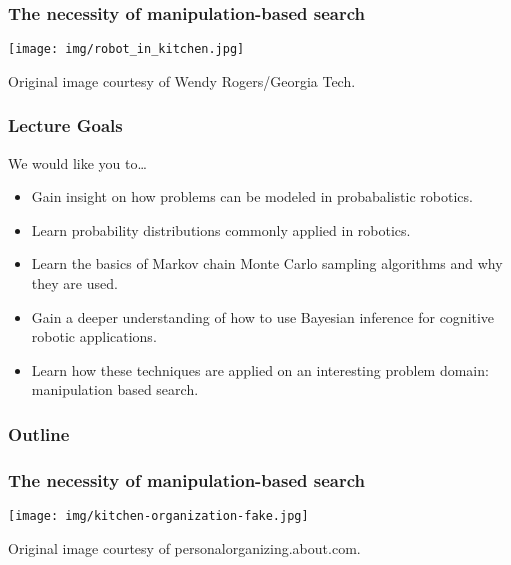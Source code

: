 \begin{frame}
  \maketitle
\end{frame}

\begin{frame}
  \frametitle{The necessity of manipulation-based search}
  \begin{center}
    \texttt{[image: img/robot\_in\_kitchen.jpg]}

    \tiny{Original image courtesy of Wendy Rogers/Georgia Tech.}
  \end{center}
\end{frame}

\begin{frame}
  \frametitle{Lecture Goals}
  We would like you to\ldots
  \begin{itemize}
    \item Gain insight on how problems can be modeled in probabalistic robotics.
    \item Learn probability distributions commonly applied in robotics.
    \item Learn the basics of Markov chain Monte Carlo sampling algorithms and
      why they are used.
    \item Gain a deeper understanding of how to use Bayesian inference for
      cognitive robotic applications.
    \item Learn how these techniques are applied on an interesting problem domain:
      manipulation based search.
  \end{itemize}
\end{frame}

\begin{frame}
  \frametitle{Outline}
  \tableofcontents
\end{frame}

\begin{frame}
  \frametitle{The necessity of manipulation-based search}
  \begin{center}
    \texttt{[image: img/kitchen-organization-fake.jpg]}

    \tiny{Original image courtesy of personalorganizing.about.com.}
  \end{center}
\end{frame}

